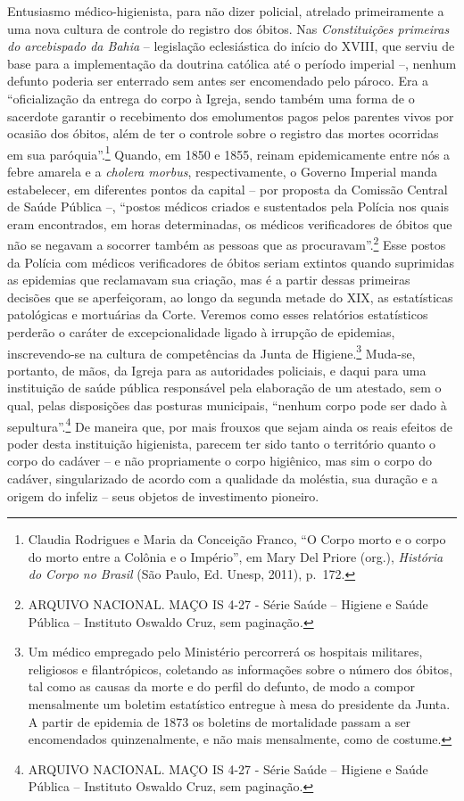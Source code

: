 Entusiasmo médico-higienista, para não dizer policial, atrelado
primeiramente a uma nova cultura de controle do registro dos óbitos. Nas
\emph{Constituições primeiras do arcebispado da Bahia} -- legislação
eclesiástica do início do XVIII, que serviu de base para a implementação
da doutrina católica até o período imperial --, nenhum defunto poderia
ser enterrado sem antes ser encomendado pelo pároco. Era a
``oficialização da entrega do corpo à Igreja, sendo também uma forma de
o sacerdote garantir o recebimento dos emolumentos pagos pelos parentes
vivos por ocasião dos óbitos, além de ter o controle sobre o registro
das mortes ocorridas em sua paróquia''.\footnote{Claudia Rodrigues e
  Maria da Conceição Franco, ``O Corpo morto e o corpo do morto entre a
  Colônia e o Império'', em Mary Del Priore (org.), \emph{História do
  Corpo no Brasil} (São Paulo, Ed. Unesp, 2011), p.~172.} Quando, em
1850 e 1855, reinam epidemicamente entre nós a febre amarela e a
\emph{cholera morbus}, respectivamente, o Governo Imperial manda
estabelecer, em diferentes pontos da capital -- por proposta da Comissão
Central de Saúde Pública --, ``postos médicos criados e sustentados pela
Polícia nos quais eram encontrados, em horas determinadas, os médicos
verificadores de óbitos que não se negavam a socorrer também as pessoas
que as procuravam''.\footnote{ARQUIVO NACIONAL. MAÇO IS 4-27 - Série
  Saúde -- Higiene e Saúde Pública -- Instituto Oswaldo Cruz, sem
  paginação\emph{.}} Esse postos da Polícia com médicos verificadores de
óbitos seriam extintos quando suprimidas as epidemias que reclamavam sua
criação, mas é a partir dessas primeiras decisões que se aperfeiçoram,
ao longo da segunda metade do XIX, as estatísticas patológicas e
mortuárias da Corte. Veremos como esses relatórios estatísticos perderão
o caráter de excepcionalidade ligado à irrupção de epidemias,
inscrevendo-se na cultura de competências da Junta de Higiene.\footnote{Um
  médico empregado pelo Ministério percorrerá os hospitais militares,
  religiosos e filantrópicos, coletando as informações sobre o número
  dos óbitos, tal como as causas da morte e do perfil do defunto, de
  modo a compor mensalmente um boletim estatístico entregue à mesa do
  presidente da Junta. A partir de epidemia de 1873 os boletins de
  mortalidade passam a ser encomendados quinzenalmente, e não mais
  mensalmente, como de costume.} Muda-se, portanto, de mãos, da Igreja
para as autoridades policiais, e daqui para uma instituição de saúde
pública responsável pela elaboração de um atestado, sem o qual, pelas
disposições das posturas municipais, ``nenhum corpo pode ser dado à
sepultura''.\footnote{ARQUIVO NACIONAL. MAÇO IS 4-27 - Série Saúde --
  Higiene e Saúde Pública -- Instituto Oswaldo Cruz, sem paginação.} De
maneira que, por mais frouxos que sejam ainda os reais efeitos de poder
desta instituição higienista, parecem ter sido tanto o território quanto
o corpo do cadáver -- e não propriamente o corpo higiênico, mas sim o
corpo do cadáver, singularizado de acordo com a qualidade da moléstia,
sua duração e a origem do infeliz -- seus objetos de investimento
pioneiro.

